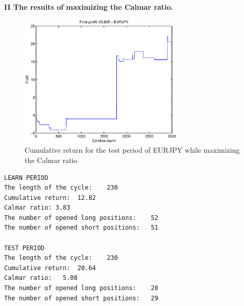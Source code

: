 \noindent \textbf{II The results of maximizing the Calmar ratio.}\\
\begin{figure}[h!]
\centering
\includegraphics[width = 0.7\textwidth]{ROC_EURJPY_LS_SearchBestKCalmar_zysk.eps}
\caption{Cumulative return for the test period of EURJPY  while maximizing the Calmar ratio}
\end{figure}
\FloatBarrier
\begin{verbatim}
LEARN PERIOD
The length of the cycle: 	230
Cumulative return: 	12.82
Calmar ratio: 3.83
The number of opened long positions: 	52
The number of opened short positions:  	51

TEST PERIOD
The length of the cycle: 	230
Cumulative return: 	20.64
Calmar ratio: 	5.08
The number of opened long positions: 	28
The number of opened short positions: 	29
\end{verbatim}

